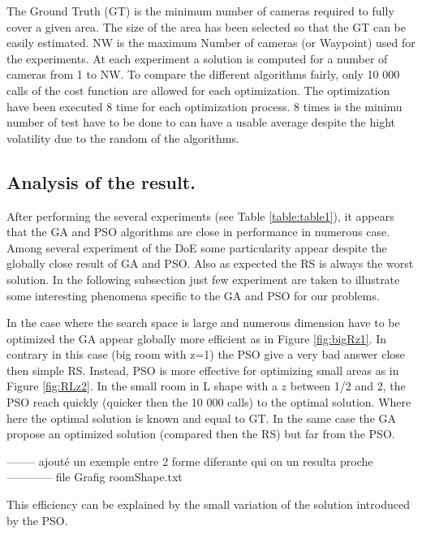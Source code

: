 The Ground Truth (GT) is the minimum number of cameras required to fully cover a given area. The size of the area has been selected so that the GT can be easily estimated. 
NW is the maximum Number of cameras (or Waypoint) used for the experiments.  
At each experiment a solution is computed for a number of cameras from 1  to NW. To compare the different algorithms fairly, only 10 000 calls of the cost function are allowed for each optimization.
The optimization have been executed 8 time for each optimization process. 8 times is the minimu number of test have to be done to can have a usable average despite the hight volatility due to the random of the algorithms.\\ %


\subsection{ Analysis of the result.}

After performing the several experiments (see Table \ref{table:table1}), it appears that the GA and PSO algorithms are close in performance in numerous case. Among several experiment of the DoE some particularity appear despite the globally close result of GA and PSO. Also as expected the RS is always the worst solution.
 In the following subsection  just few experiment are taken to illustrate some interesting phenomena specific to the GA and PSO for our problems.

In the case where the search space is large and numerous dimension have to be optimized the GA appear globally more efficient as in Figure \ref{fig:bigRz1}. In contrary in this case (big room with z=1) the PSO give a very bad answer close then simple RS.
 Instead, PSO is more effective for optimizing small areas as in Figure \ref{fig:RLz2}. In the small room in L shape with a $z$ between 1/2 and 2, the PSO reach quickly (quicker then the 10 000 calls) to the optimal solution. Where here the optimal solution is known and equal to GT. In the same case the GA  propose an optimized solution (compared then the RS) but far from the PSO.
 
-------- ajouté un exemple entre 2 forme diferante qui on un resulta proche ------------ file Grafig roomShape.txt
 
This efficiency can be explained by the small variation of the solution introduced by the PSO. 

